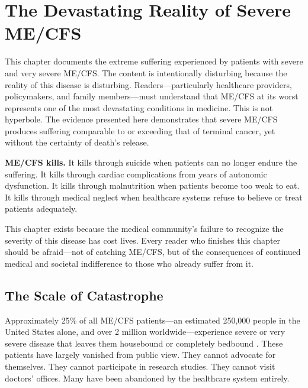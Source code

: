 
\section{The Devastating Reality of Severe ME/CFS}
\label{sec:severe-reality}

\begin{tcolorbox}[colback=red!5!white,colframe=red!75!black,title=Disturbing Content and Disease Lethality]
This chapter documents the extreme suffering experienced by patients with severe and very severe ME/CFS. The content is intentionally disturbing because the reality of this disease is disturbing. Readers---particularly healthcare providers, policymakers, and family members---must understand that ME/CFS at its worst represents one of the most devastating conditions in medicine. This is not hyperbole. The evidence presented here demonstrates that severe ME/CFS produces suffering comparable to or exceeding that of terminal cancer, yet without the certainty of death's release.

\textbf{ME/CFS kills.} It kills through suicide when patients can no longer endure the suffering. It kills through cardiac complications from years of autonomic dysfunction. It kills through malnutrition when patients become too weak to eat. It kills through medical neglect when healthcare systems refuse to believe or treat patients adequately.

This chapter exists because the medical community's failure to recognize the severity of this disease has cost lives. Every reader who finishes this chapter should be afraid---not of catching ME/CFS, but of the consequences of continued medical and societal indifference to those who already suffer from it.
\end{tcolorbox}

\subsection{The Scale of Catastrophe}
\label{sec:severe-scale}

Approximately 25\% of all ME/CFS patients---an estimated 250,000 people in the United States alone, and over 2 million worldwide---experience severe or very severe disease that leaves them housebound or completely bedbound \cite{Montoya2021severe}. These patients have largely vanished from public view. They cannot advocate for themselves. They cannot participate in research studies. They cannot visit doctors' offices. Many have been abandoned by the healthcare system entirely.

